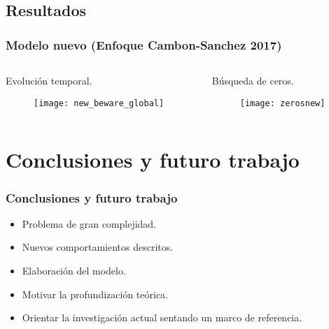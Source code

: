 \documentclass{beamer}
\begin{document}
\subsection{Resultados}

\begin{frame}
\frametitle{Modelo nuevo (Enfoque Cambon-Sanchez 2017)}
\begin{columns}
	\begin{column}{0.5\textwidth}
		Evolución temporal.
		\begin{figure}
			\texttt{[image: new\_beware\_global]}
		\end{figure}
	\end{column}
	\begin{column}{0.5\textwidth}
		Búsqueda de ceros.
		\begin{figure}
			\texttt{[image: zerosnew]}
		\end{figure}
	\end{column}
\end{columns}
\end{frame}

\section{Conclusiones y futuro trabajo}

\begin{frame}
	\frametitle{Conclusiones y futuro trabajo}
	
	\begin{itemize}
		\item Problema de gran complejidad.
		\item Nuevos comportamientos descritos.
		\item Elaboración del modelo. 
		\item Motivar la profundización teórica.
		\item Orientar la investigación actual sentando un marco de referencia.
	\end{itemize}
\end{frame}
\end{document}
